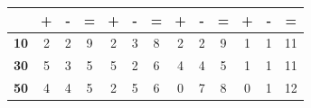\documentclass[12pt,a4paper]{report}
\begin{document}
{{{{{{\begin{table}[h]
\begin{tabular}{|c|c|c|c|c|c|c|c|c|c|c|c|c|}
         & {\bf\hspace{3mm}+\hspace{3mm}}       & {\bf\hspace{4mm}-\hspace{4mm}}      & {\bf\hspace{1mm}=\hspace{1mm}}      & {\bf\hspace{1mm}+\hspace{1mm}}       & {\bf\hspace{1mm}-\hspace{1mm}}       & {\bf\hspace{1mm}=}       & {\bf\hspace{2mm}+\hspace{2mm}}        & {\bf\hspace{3mm}-\hspace{3mm}}        & {\bf\hspace{1mm}=\hspace{1mm}}       & {\bf\hspace{1mm}+\hspace{1mm}}   & {\bf\hspace{1mm}-\hspace{1mm}}   & {\bf\hspace{1mm}=\hspace{1mm}}  \\ \hline
{\bf 10} & 2             & 2            & 9            & 2             & 3             & 8             & 2              & 2              & 9             & 1         & 1         & 11        \\ \hline
{\bf 30} & 5             & 3            & 5            & 5             & 2             & 6             & 4              & 4              & 5             & 1         & 1         & 11        \\ \hline
{\bf 50} & 4             & 4            & 5            & 2             & 5             & 6             & 0              & 7              & 8             & 0         & 1         &  12        \\ \hline
\end{tabular}
\end{table}


}}}}}}
\end{document}
